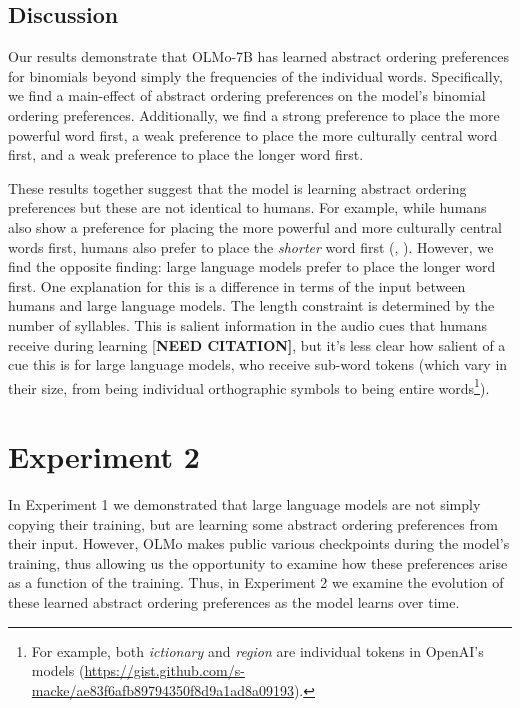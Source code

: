 \documentclass[
  nottoc]{article}
\begin{document}
\subsection{Discussion}\label{discussion}

Our results demonstrate that OLMo-7B has learned abstract ordering
preferences for binomials beyond simply the frequencies of the
individual words. Specifically, we find a main-effect of abstract
ordering preferences on the model's binomial ordering preferences.
Additionally, we find a strong preference to place the more powerful
word first, a weak preference to place the more culturally central word
first, and a weak preference to place the longer word first.

These results together suggest that the model is learning abstract
ordering preferences but these are not identical to humans. For example,
while humans also show a preference for placing the more powerful and
more culturally central words first, humans also prefer to place the
\emph{shorter} word first
(, ).
However, we find the opposite finding: large language models prefer to
place the longer word first. One explanation for this is a difference in
terms of the input between humans and large language models. The length
constraint is determined by the number of syllables. This is salient
information in the audio cues that humans receive during learning
{[}\textbf{NEED CITATION{]}}, but it's less clear how salient of a cue
this is for large language models, who receive sub-word tokens (which
vary in their size, from being individual orthographic symbols to being
entire words\footnote{For example, both \emph{ictionary} and
  \emph{region} are individual tokens in OpenAI's models
  (\url{https://gist.github.com/s-macke/ae83f6afb89794350f8d9a1ad8a09193}).}).

\section{Experiment 2}\label{experiment-2}

In Experiment 1 we demonstrated that large language models are not
simply copying their training, but are learning some abstract ordering
preferences from their input. However, OLMo makes public various
checkpoints during the model's training, thus allowing us the
opportunity to examine how these preferences arise as a function of the
training. Thus, in Experiment 2 we examine the evolution of these
learned abstract ordering preferences as the model learns over time.
\end{document}
